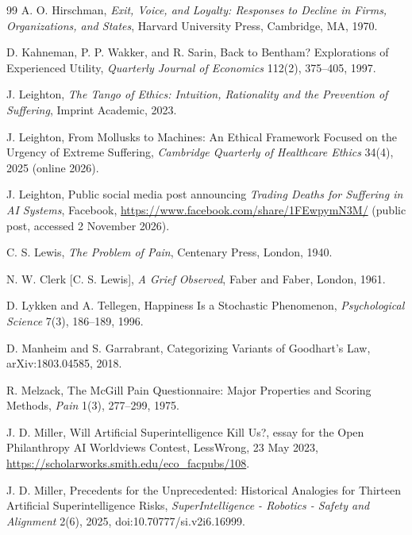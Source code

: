 \documentclass[11pt]{article}
\begin{document}
\begin{thebibliography}{99}
 A. O. Hirschman, \emph{Exit, Voice, and Loyalty: Responses to Decline in Firms, Organizations, and States}, Harvard University Press, Cambridge, MA, 1970.

 D. Kahneman, P. P. Wakker, and R. Sarin, Back to Bentham? Explorations of Experienced Utility, \emph{Quarterly Journal of Economics} 112(2), 375--405, 1997.

 J. Leighton, \emph{The Tango of Ethics: Intuition, Rationality and the Prevention of Suffering}, Imprint Academic, 2023.

 J. Leighton, From Mollusks to Machines: An Ethical Framework Focused on the Urgency of Extreme Suffering, \emph{Cambridge Quarterly of Healthcare Ethics} 34(4), 2025 (online 2026).

 J. Leighton, Public social media post announcing \emph{Trading Deaths for Suffering in AI Systems}, Facebook, \url{https://www.facebook.com/share/1FEwpymN3M/} (public post, accessed 2 November 2026).

 C. S. Lewis, \emph{The Problem of Pain}, Centenary Press, London, 1940.

 N. W. Clerk [C. S. Lewis], \emph{A Grief Observed}, Faber and Faber, London, 1961.

 D. Lykken and A. Tellegen, Happiness Is a Stochastic Phenomenon, \emph{Psychological Science} 7(3), 186--189, 1996.

 D. Manheim and S. Garrabrant, Categorizing Variants of Goodhart's Law, arXiv:1803.04585, 2018.

 R. Melzack, The McGill Pain Questionnaire: Major Properties and Scoring Methods, \emph{Pain} 1(3), 277--299, 1975.

 J. D. Miller, Will Artificial Superintelligence Kill Us?, essay for the Open Philanthropy AI Worldviews Contest, LessWrong, 23 May 2023, \url{https://scholarworks.smith.edu/eco_facpubs/108}.

 J. D. Miller, Precedents for the Unprecedented: Historical Analogies for Thirteen Artificial Superintelligence Risks, \emph{SuperIntelligence - Robotics - Safety and Alignment} 2(6), 2025, doi:10.70777/si.v2i6.16999.


\end{thebibliography}
\end{document}
